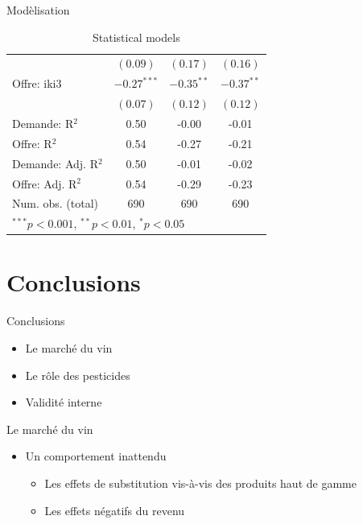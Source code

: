 \documentclass[11pt,ignorenonframetext,]{beamer}
\providecommand{\tightlist}{%
  \setlength{\itemsep}{0pt}\setlength{\parskip}{0pt}}
\begin{document}
\begin{frame}{Modèlisation}
\begin{table}[!htbp]
\begin{center}
\begin{tabular}{l c c c }
                    & $(0.09)$       & $(0.17)$       & $(0.16)$       \\
Offre: iki3         & $-0.27^{***}$  & $-0.35^{**}$   & $-0.37^{**}$   \\
                    & $(0.07)$       & $(0.12)$       & $(0.12)$       \\
\hline
Demande: R$^2$      & 0.50           & -0.00          & -0.01          \\
Offre: R$^2$        & 0.54           & -0.27          & -0.21          \\
Demande: Adj. R$^2$ & 0.50           & -0.01          & -0.02          \\
Offre: Adj. R$^2$   & 0.54           & -0.29          & -0.23          \\
Num. obs. (total)   & 690            & 690            & 690            \\
\hline
\multicolumn{4}{l}{\scriptsize{$^{***}p<0.001$, $^{**}p<0.01$, $^*p<0.05$}}
\end{tabular}
\caption{Statistical models}
\label{table : ols, 2sls et 3sls, full information clusters}
\end{center}
\end{table}

\normalsize

\end{frame}

\hypertarget{conclusions}{%
\section{Conclusions}\label{conclusions}}

\begin{frame}{Conclusions}
\protect\hypertarget{conclusions-1}{}

\begin{itemize}
\tightlist
\item
  Le marché du vin
\item
  Le rôle des pesticides\\
\item
  Validité interne
\end{itemize}

\end{frame}

\begin{frame}{Le marché du vin}
\protect\hypertarget{le-marche-du-vin}{}

\begin{itemize}
\tightlist
\item
  Un comportement inattendu

  \begin{itemize}
  \tightlist
  \item
    Les effets de substitution vis-à-vis des produits haut de gamme
  \item
    Les effets négatifs du revenu
  \end{itemize}
\end{itemize}

\end{frame}
\end{document}
